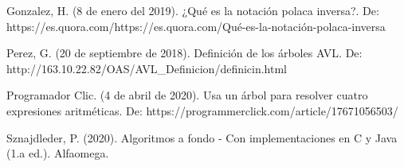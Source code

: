 \documentclass[12pt]{article}
\begin{document}
\begin{thebibliography}{}
Gonzalez, H. (8 de enero del 2019). ¿Qué es la notación polaca inversa?. De: https://es.quora.com/https://es.quora.com/Qué-es-la-notación-polaca-inversa

Perez, G. (20 de septiembre de 2018). Definición de los árboles AVL. De: http://163.10.22.82/OAS/AVL\_Definicion/definicin.html

Programador Clic. (4 de abril de 2020). Usa un árbol para resolver cuatro expresiones aritméticas. De: https://programmerclick.com/article/17671056503/

Sznajdleder, P. (2020). Algoritmos a fondo - Con implementaciones en C y Java (1.a ed.). Alfaomega.


\end{thebibliography}
\end{document}
